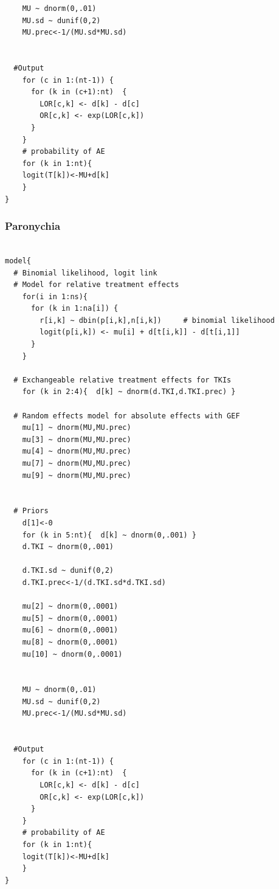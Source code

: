\documentclass[11pt,final,fleqn]{article}\usepackage[]{graphicx}\usepackage[]{color}
\theoremstyle{plain}
\begin{document}
\begin{appendices}
\begin{verbatim}
    MU ~ dnorm(0,.01)                         
    MU.sd ~ dunif(0,2) 
    MU.prec<-1/(MU.sd*MU.sd)
    
      
  #Output                                     
    for (c in 1:(nt-1)) {                        
      for (k in (c+1):nt)  { 
        LOR[c,k] <- d[k] - d[c]
        OR[c,k] <- exp(LOR[c,k])
      }  
    }
    # probability of AE
    for (k in 1:nt){ 
    logit(T[k])<-MU+d[k]
    }
}

\end{verbatim}

\subsubsection{Paronychia}
\begin{verbatim} 

model{
  # Binomial likelihood, logit link
  # Model for relative treatment effects
    for(i in 1:ns){                  
      for (k in 1:na[i]) {               
        r[i,k] ~ dbin(p[i,k],n[i,k])     # binomial likelihood
        logit(p[i,k]) <- mu[i] + d[t[i,k]] - d[t[i,1]]  
      }
    }   
  
  # Exchangeable relative treatment effects for TKIs
    for (k in 2:4){  d[k] ~ dnorm(d.TKI,d.TKI.prec) }
  
  # Random effects model for absolute effects with GEF
    mu[1] ~ dnorm(MU,MU.prec) 
    mu[3] ~ dnorm(MU,MU.prec)
    mu[4] ~ dnorm(MU,MU.prec)
    mu[7] ~ dnorm(MU,MU.prec) 
    mu[9] ~ dnorm(MU,MU.prec) 
       
       
  # Priors
    d[1]<-0                                      
    for (k in 5:nt){  d[k] ~ dnorm(0,.001) }     
    d.TKI ~ dnorm(0,.001)
    
    d.TKI.sd ~ dunif(0,2) 
    d.TKI.prec<-1/(d.TKI.sd*d.TKI.sd)
    
    mu[2] ~ dnorm(0,.0001)                     
    mu[5] ~ dnorm(0,.0001)
    mu[6] ~ dnorm(0,.0001)
    mu[8] ~ dnorm(0,.0001)
    mu[10] ~ dnorm(0,.0001)
                     
      
    MU ~ dnorm(0,.01)                         
    MU.sd ~ dunif(0,2) 
    MU.prec<-1/(MU.sd*MU.sd)
    
      
  #Output                                        
    for (c in 1:(nt-1)) {                        
      for (k in (c+1):nt)  { 
        LOR[c,k] <- d[k] - d[c]
        OR[c,k] <- exp(LOR[c,k])
      }  
    }
    # probability of AE
    for (k in 1:nt){ 
    logit(T[k])<-MU+d[k]
    }
}


\end{verbatim}
\end{appendices}
\end{document}
